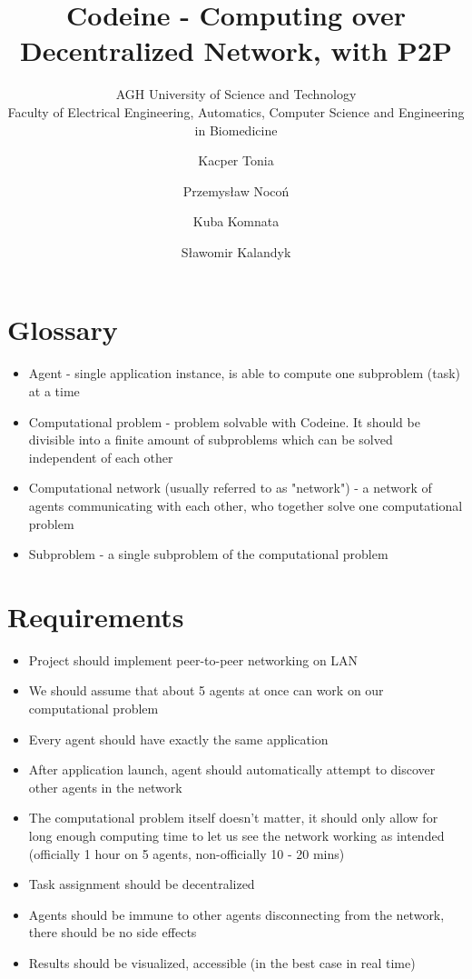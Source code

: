 \documentclass{article}
\title{Codeine - Computing over Decentralized Network, with P2P}
\subtitle{AGH University of Science and Technology\\
    Faculty of Electrical Engineering, Automatics, Computer Science and Engineering in Biomedicine}
\author{Kacper Tonia\and
        Przemysław Nocoń\and
        Kuba Komnata\and
        Sławomir Kalandyk}
\date{}
\begin{document}
\maketitle

\section{Glossary}
\begin{itemize}
    \item Agent - single application instance, is able to compute one subproblem (task) at a time
    \item Computational problem - problem solvable with Codeine. It should be divisible into a finite amount of subproblems which can be solved independent of each other
    \item Computational network (usually referred to as "network") - a network of agents communicating with each other, who together solve one computational problem
    \item Subproblem - a single subproblem of the computational problem
\end{itemize}

\section{Requirements}
\begin{itemize}
    \item Project should implement peer-to-peer networking on LAN
    \item We should assume that about 5 agents at once can work on our computational problem
    \item Every agent should have exactly the same application
    \item After application launch, agent should automatically attempt to discover other agents in the network
    \item The computational problem itself doesn't matter, it should only allow for long enough computing time to let us see the network working as intended (officially 1 hour on 5 agents, non-officially 10 - 20 mins)
    \item Task assignment should be decentralized
    \item Agents should be immune to other agents disconnecting from the network, there should be no side effects
    \item Results should be visualized, accessible (in the best case in real time)
\end{itemize}
\end{document}
